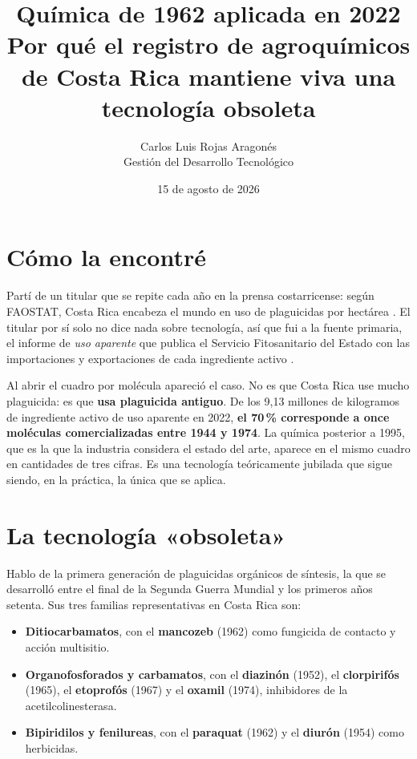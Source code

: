 \documentclass[11pt,letterpaper]{article}
\title{\vspace{-1.2cm}\textbf{Química de 1962 aplicada en 2022}\\
\large Por qué el registro de agroquímicos de Costa Rica mantiene viva
una tecnología obsoleta}
\author{Carlos Luis Rojas Aragonés\\
\small Gestión del Desarrollo Tecnológico}
\date{\small 15 de agosto de 2026}
\begin{document}
\maketitle
\vspace{-0.6em}

\section{Cómo la encontré}

Partí de un titular que se repite cada año en la prensa costarricense: según
FAOSTAT, Costa Rica encabeza el mundo en uso de plaguicidas por hectárea
\parencite{semanario2023}. El titular por sí solo no dice nada sobre tecnología,
así que fui a la fuente primaria, el informe de \emph{uso aparente} que publica
el Servicio Fitosanitario del Estado con las importaciones y exportaciones de
cada ingrediente activo \parencite{sfe2022}.

Al abrir el cuadro por molécula apareció el caso. No es que Costa Rica use
mucho plaguicida: es que \textbf{usa plaguicida antiguo}. De los 9,13 millones de
kilogramos de ingrediente activo de uso aparente en 2022, \textbf{el 70\,\%
corresponde a once moléculas comercializadas entre 1944 y 1974}. La química posterior
a 1995, que es la que la industria considera el estado del arte, aparece en el
mismo cuadro en cantidades de tres cifras. Es una tecnología teóricamente
jubilada que sigue siendo, en la práctica, la única que se aplica.

\section{La tecnología «obsoleta»}

Hablo de la primera generación de plaguicidas orgánicos de síntesis, la que se
desarrolló entre el final de la Segunda Guerra Mundial y los primeros años
setenta. Sus tres familias representativas en Costa Rica son:

\begin{itemize}
  \item \textbf{Ditiocarbamatos}, con el \textbf{mancozeb} (1962) como fungicida
    de contacto y acción multisitio.
  \item \textbf{Organofosforados y carbamatos}, con el \textbf{diazinón} (1952),
    el \textbf{clorpirifós} (1965), el \textbf{etoprofós} (1967) y el
    \textbf{oxamil} (1974), inhibidores de la acetilcolinesterasa.
  \item \textbf{Bipiridilos y fenilureas}, con el \textbf{paraquat} (1962) y el
    \textbf{diurón} (1954) como herbicidas.
\end{itemize}
\end{document}
